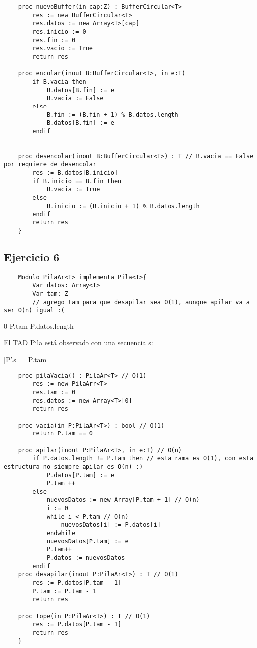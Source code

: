 \documentclass[10pt,a4paper]{article}
\begin{document}
\begin{lstlisting}
	proc nuevoBuffer(in cap:Z) : BufferCircular<T>
		res := new BufferCircular<T>
		res.datos := new Array<T>[cap]
		res.inicio := 0
		res.fin := 0
		res.vacio := True
		return res
	
	proc encolar(inout B:BufferCircular<T>, in e:T)
		if B.vacia then
			B.datos[B.fin] := e
			B.vacia := False
		else
			B.fin := (B.fin + 1) % B.datos.length
			B.datos[B.fin] := e
		endif

	
	proc desencolar(inout B:BufferCircular<T>) : T // B.vacia == False por requiere de desencolar
		res := B.datos[B.inicio]
		if B.inicio == B.fin then
			B.vacia := True
		else 
			B.inicio := (B.inicio + 1) % B.datos.length
		endif
		return res
	}
\end{lstlisting}

\subsection{Ejercicio 6}

\begin{lstlisting}
	Modulo PilaAr<T> implementa Pila<T>{
		Var datos: Array<T>
		Var tam: Z
		// agrego tam para que desapilar sea O(1), aunque apilar va a ser O(n) igual :(
\end{lstlisting}

{0 \le P.tam \le P.datos.length}

El TAD Pila está observado con una secuencia s:

{|P'.s| = P.tam \yLuego \\
}

\begin{lstlisting}
	proc pilaVacia() : PilaAr<T> // O(1)
		res := new PilaArr<T>
		res.tam := 0 
		res.datos := new Array<T>[0]
		return res

	proc vacia(in P:PilaAr<T>) : bool // O(1)
		return P.tam == 0

	proc apilar(inout P:PilaAr<T>, in e:T) // O(n)
		if P.datos.length != P.tam then // esta rama es O(1), con esta estructura no siempre apilar es O(n) :)
			P.datos[P.tam] := e
			P.tam ++
		else
			nuevosDatos := new Array[P.tam + 1] // O(n)
			i := 0 
			while i < P.tam // O(n)
				nuevosDatos[i] := P.datos[i]
			endwhile
			nuevosDatos[P.tam] := e
			P.tam++
			P.datos := nuevosDatos
		endif
	proc desapilar(inout P:PilaAr<T>) : T // O(1)
		res := P.datos[P.tam - 1]
		P.tam := P.tam - 1
		return res
		
	proc tope(in P:PilaAr<T>) : T // O(1)
		res := P.datos[P.tam - 1]
		return res
	}
\end{lstlisting}
\end{document}
